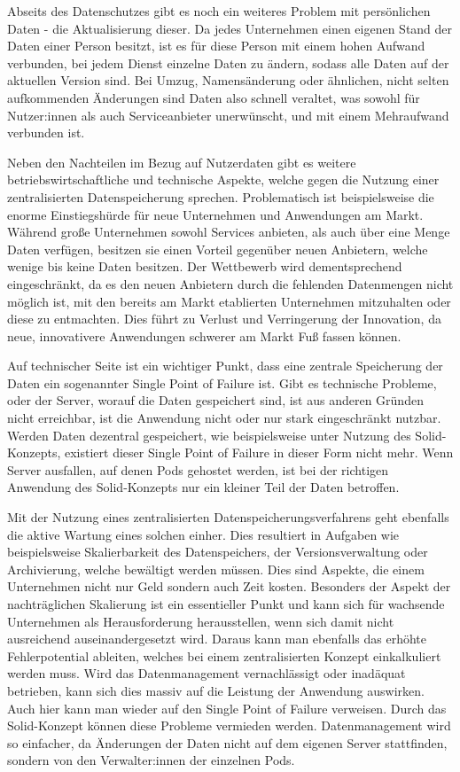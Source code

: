 \documentclass[acmtog]{acmart}
\begin{document}
Abseits des Datenschutzes gibt es noch ein weiteres Problem mit persönlichen Daten - die Aktualisierung dieser. Da jedes Unternehmen einen eigenen Stand der Daten einer Person besitzt, ist es für diese Person mit einem hohen Aufwand verbunden, bei jedem Dienst einzelne Daten zu ändern, sodass alle Daten auf der aktuellen Version sind. Bei Umzug, Namensänderung oder ähnlichen, nicht selten aufkommenden Änderungen sind Daten also schnell veraltet, was sowohl für Nutzer:innen als auch Serviceanbieter unerwünscht, und mit einem Mehraufwand verbunden ist.

Neben den Nachteilen im Bezug auf Nutzerdaten gibt es weitere betriebswirtschaftliche und technische Aspekte, welche gegen die Nutzung einer zentralisierten Datenspeicherung sprechen. Problematisch ist beispielsweise die enorme Einstiegshürde für neue Unternehmen und Anwendungen am Markt. Während große Unternehmen sowohl Services anbieten, als auch über eine Menge Daten verfügen, besitzen sie einen Vorteil gegenüber neuen Anbietern, welche wenige bis keine Daten besitzen. Der Wettbewerb wird dementsprechend eingeschränkt, da es den neuen Anbietern durch die fehlenden Datenmengen nicht möglich ist, mit den bereits am Markt etablierten Unternehmen mitzuhalten oder diese zu entmachten. Dies führt zu Verlust und Verringerung der Innovation, da neue, innovativere Anwendungen schwerer am Markt Fuß fassen können.

Auf technischer Seite ist ein wichtiger Punkt, dass eine zentrale Speicherung der Daten ein sogenannter Single Point of Failure ist. Gibt es technische Probleme, oder der Server, worauf die Daten gespeichert sind, ist aus anderen Gründen nicht erreichbar, ist die Anwendung nicht oder nur stark eingeschränkt nutzbar. Werden Daten dezentral gespeichert, wie beispielsweise unter Nutzung des Solid-Konzepts, existiert dieser Single Point of Failure in dieser Form nicht mehr. Wenn Server ausfallen, auf denen Pods gehostet werden, ist bei der richtigen Anwendung des Solid-Konzepts nur ein kleiner Teil der Daten betroffen.

Mit der Nutzung eines zentralisierten Datenspeicherungsverfahrens geht ebenfalls die aktive Wartung eines solchen einher. Dies resultiert in Aufgaben wie beispielsweise Skalierbarkeit des Datenspeichers, der Versionsverwaltung oder Archivierung, welche bewältigt werden müssen. Dies sind Aspekte, die einem Unternehmen nicht nur Geld sondern auch Zeit kosten. Besonders der Aspekt der nachträglichen Skalierung ist ein essentieller Punkt und kann sich für wachsende Unternehmen als Herausforderung herausstellen, wenn sich damit nicht ausreichend auseinandergesetzt wird.
Daraus kann man ebenfalls das erhöhte Fehlerpotential ableiten, welches bei einem zentralisierten Konzept einkalkuliert werden muss. Wird das Datenmanagement vernachlässigt oder inadäquat betrieben, kann sich dies massiv auf die Leistung der Anwendung auswirken. Auch hier kann man wieder auf den Single Point of Failure verweisen. Durch das Solid-Konzept können diese Probleme vermieden werden. Datenmanagement wird so einfacher, da Änderungen der Daten nicht auf dem eigenen Server stattfinden, sondern von den Verwalter:innen der einzelnen Pods. 
\end{document}
